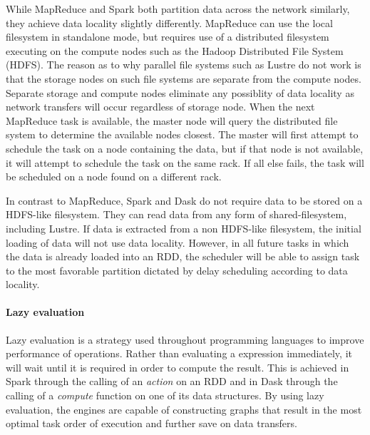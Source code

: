                     While MapReduce and Spark both partition data across the
                    network similarly, they achieve data locality slightly
                    differently. MapReduce can use the local filesystem in
                    standalone mode, but requires use of a distributed
                    filesystem executing on the compute nodes such as the Hadoop
                    Distributed File System (HDFS). The reason as to why
                    parallel file systems such as Lustre do not work is that the
                    storage nodes on such file systems are separate from the
                    compute nodes. Separate storage and compute nodes eliminate
                    any possiblity of data locality as network transfers will
                    occur regardless of storage node. When the next MapReduce
                    task is available, the master node will query the
                    distributed file system to determine the available nodes
                    closest. The master will first attempt to schedule the task
                    on a node containing the data, but if that node is not
                    available, it will attempt to schedule the task on the same
                    rack. If all else fails, the task will be scheduled on a
                    node found on a different rack. 

                    In contrast to MapReduce, Spark and Dask do not require data
                    to be stored on a HDFS-like filesystem. They can read data
                    from any form of shared-filesystem, including Lustre. If
                    data is extracted from a non HDFS-like filesystem, the
                    initial loading of data will not use data locality. However,
                    in all future tasks in which the data is already loaded into
                    an RDD, the scheduler will be able to assign task to the
                    most favorable partition dictated by delay scheduling
                    according to data locality.

                    
                \paragraph{Lazy evaluation}

                    Lazy evaluation is a strategy used throughout programming
                    languages to improve performance of operations. Rather than
                    evaluating a expression immediately, it will wait until it
                    is required in order to compute the result. This is achieved
                    in Spark through the calling of an \textit{action} on an RDD
                    and in Dask through the calling of a \textit{compute}
                    function on one of its data structures. By using lazy
                    evaluation, the engines are capable of constructing graphs
                    that result in the most optimal task order of execution and
                    further save on data transfers. 

